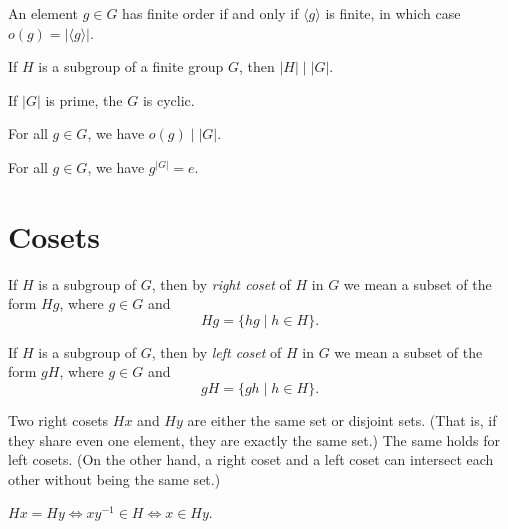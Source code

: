 \begin{theorem}
	An element $g \in G$ has finite order if and only if $\langle g \rangle$ is
	finite, in which case $o(g) = |\langle g \rangle|$.
\end{theorem}

\begin{theorem}
	If $H$ is a subgroup of a finite group $G$, then $|H| \mid |G|$.
\end{theorem}

\begin{corollary}
	If $|G|$ is prime, the $G$ is cyclic.
\end{corollary}

\begin{corollary}
	For all $g \in G$, we have $o(g) \mid |G|$.
\end{corollary}

\begin{corollary}
	For all $g \in G$, we have $g^{|G|} = e$.
\end{corollary}

\section*{Cosets}

\begin{definition}
	If $H$ is a subgroup of $G$, then by \emph{right coset} of $H$ in $G$ we
	mean a subset of the form $Hg$, where $g \in G$ and
	\[
		Hg = \{hg \mid h \in H\}.
	\]
\end{definition}

\begin{definition}
	If $H$ is a subgroup of $G$, then by \emph{left coset} of $H$ in $G$ we
	mean a subset of the form $gH$, where $g \in G$ and
	\[
		gH = \{gh \mid h \in H\}.
	\]
\end{definition}

\begin{theorem}
	Two right cosets $Hx$ and $Hy$ are either the same set or disjoint sets.
	(That is, if they share even one element, they are exactly the same set.) The
	same holds for left cosets. (On the other hand, a right coset and a left
	coset can intersect each other without being the same set.)
\end{theorem}

\begin{corollary}
	$Hx = Hy \Longleftrightarrow xy^{-1} \in H \Longleftrightarrow x \in Hy$.
\end{corollary}

